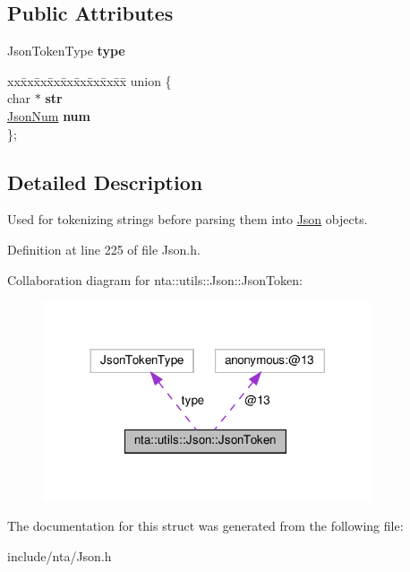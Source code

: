 \subsection*{Public Attributes}
\begin{DoxyCompactItemize}
\item 
\mbox{\label{structnta_1_1utils_1_1Json_1_1JsonToken_ab0bf0cda189a3063f326abcbf57532bb}} 
Json\+Token\+Type {\bfseries type}
\item 
\mbox{\label{structnta_1_1utils_1_1Json_1_1JsonToken_a7123d444ecb1662248a2b54d4f27d087}} 
\begin{tabbing}
xx\=xx\=xx\=xx\=xx\=xx\=xx\=xx\=xx\=\kill
union \{\\
\mbox{\label{structnta_1_1utils_1_1Json_1_1JsonToken_a249048bb34d397d9f9034391f07e8666}} 
char $\ast$ {\bfseries str}\\
\mbox{\label{structnta_1_1utils_1_1Json_1_1JsonToken_a276868d3bfc600a8e9b00a9719d09122}} 
\hyperlink{classnta_1_1utils_1_1JsonNum}{JsonNum} {\bfseries num}\\
\}; \\

\end{tabbing}\end{DoxyCompactItemize}


\subsection{Detailed Description}
Used for tokenizing strings before parsing them into \hyperlink{classnta_1_1utils_1_1Json}{Json} objects. 

Definition at line 225 of file Json.\+h.



Collaboration diagram for nta\+:\+:utils\+:\+:Json\+:\+:Json\+Token\+:\nopagebreak
\begin{figure}[H]
\begin{center}
\leavevmode
\includegraphics[width=276pt]{d9/d6a/structnta_1_1utils_1_1Json_1_1JsonToken__coll__graph}
\end{center}
\end{figure}


The documentation for this struct was generated from the following file\+:\begin{DoxyCompactItemize}
\item 
include/nta/Json.\+h\end{DoxyCompactItemize}
